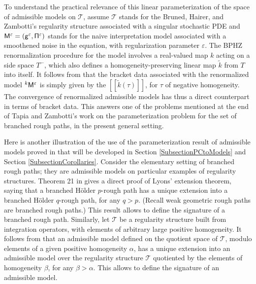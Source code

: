 \documentclass[11pt]{article}
\numberwithin{equation}{section}
\theoremstyle{plain}
\theoremstyle{definition}
\newcommand{\Brac}[1]{[\![#1]\!]}
\let\epsilon\varepsilon
\begin{document}
To understand the practical relevance of this linear parameterization of the space of admissible models on $\mathscr{T}$, assume $\mathscr{T}$ stands for the Bruned, Hairer, and Zambotti's regularity structure \cite{BHZ} associated with a singular stochastic PDE and ${\sf M}^\epsilon = ({\sf g}^\epsilon,{\sf \Pi}^\epsilon)$ stands for the naive interpretation model associated with a smoothened noise in the equation, with regularization parameter $\epsilon$. The BPHZ renormalization procedure for the model involves a real-valued map $k$ acting on a side space $T^-$, which also defines a homogeneity-preserving linear map $\widetilde{k}$ from $T$ into itself. It follows from \cite[Th.\,21]{BH} that the bracket data associated with the renormalized model $^k{{\sf M}^\epsilon}$ is simply given by the $\Brac{\widetilde{k}(\tau)}$, for $\tau$ of negative homogeneity. The convergence of renormalized admissible models has thus a direct counterpart in terms of bracket data. This answers one of the problems mentioned at the end of Tapia and Zambotti's work \cite{TZ18} on the parameterization problem for the set of branched rough paths, in the present general setting.

Here is another illustration of the use of the parameterization result of admissible models proved in \cite{BH} that will be developed in Section \ref{SubsectionPCtoModels} and Section \ref{SubsectionCorollaries}. Consider the elementary setting of branched rough paths; they are admissible models on particular examples of regularity structures. Theorem 21 in \cite{BH} gives a direct proof of Lyons' extension theorem, saying that a branched Hölder $p$-rough path has a unique extension into a branched Hölder $q$-rough path, for any $q>p$. (Recall weak geometric rough paths are branched rough paths.) This result allows to define the signature of a branched rough path. Similarly, let $\mathscr{T}$ be a regularity structure built from integration operators, with elements of arbitrary large positive homogeneity. It follows from \hbox{\cite[Th.\,21]{BH}} that an admissible model defined on the quotient space of $\mathscr{T}$, modulo elements of a given positive homogeneity $\alpha$, has a unique extension into an admissible model over the regularity structure $\mathscr{T}$ quotiented by the elements of homogeneity $\beta$, for any $\beta>\alpha$. This allows to define the signature of an admissible model.
\end{document}
